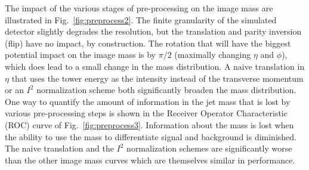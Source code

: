 The impact of the various stages of pre-processing on the image mass are illustrated in Fig.~\ref{fig:preprocess2}.  The finite granularity of the simulated detector slightly degrades the resolution, but the translation and parity inversion (flip) have no impact, by construction.  The rotation that will have the biggest potential impact on the image mass is by $\pi/2$ (maximally changing $\eta$ and $\phi$), which does lead to a small change in the mass distribution.  A naive translation in $\eta$ that uses the tower energy as the intensity instead of the transverse momentum or an $I^2$ normalization scheme both significantly broaden the mass distribution.  One way to quantify the amount of information in the jet mass that is lost by various pre-processing steps is shown in the Receiver Operator Characteristic (ROC) curve of Fig.~\ref{fig:preprocess3}.   Information about the mass is lost when the ability to use the mass to differentiate signal and background is diminished.  The naive translation and the $I^2$ normalization schemes are significantly worse than the other image mass curves which are themselves similar in performance. 

